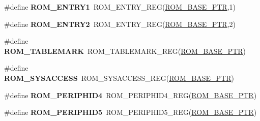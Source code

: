 \begin{DoxyCompactItemize}
\item 
\mbox{\label{group___r_o_m___register___accessor___macros_gac1064716d92d1384ff4b0bf063baabe6}} 
\#define {\bfseries R\+O\+M\+\_\+\+E\+N\+T\+R\+Y1}~R\+O\+M\+\_\+\+E\+N\+T\+R\+Y\+\_\+\+R\+EG(\hyperlink{group___r_o_m___peripheral_ga5ad426d10b6832ca7012e8767113f686}{R\+O\+M\+\_\+\+B\+A\+S\+E\+\_\+\+P\+TR},1)
\item 
\mbox{\label{group___r_o_m___register___accessor___macros_ga0ae5079cc5e456ff696440862af66421}} 
\#define {\bfseries R\+O\+M\+\_\+\+E\+N\+T\+R\+Y2}~R\+O\+M\+\_\+\+E\+N\+T\+R\+Y\+\_\+\+R\+EG(\hyperlink{group___r_o_m___peripheral_ga5ad426d10b6832ca7012e8767113f686}{R\+O\+M\+\_\+\+B\+A\+S\+E\+\_\+\+P\+TR},2)
\item 
\mbox{\label{group___r_o_m___register___accessor___macros_gaf0a5aeb4d78f9d16a13d1e5372484075}} 
\#define {\bfseries R\+O\+M\+\_\+\+T\+A\+B\+L\+E\+M\+A\+RK}~R\+O\+M\+\_\+\+T\+A\+B\+L\+E\+M\+A\+R\+K\+\_\+\+R\+EG(\hyperlink{group___r_o_m___peripheral_ga5ad426d10b6832ca7012e8767113f686}{R\+O\+M\+\_\+\+B\+A\+S\+E\+\_\+\+P\+TR})
\item 
\mbox{\label{group___r_o_m___register___accessor___macros_gae51b2981e6f366d1b80e622b8642423b}} 
\#define {\bfseries R\+O\+M\+\_\+\+S\+Y\+S\+A\+C\+C\+E\+SS}~R\+O\+M\+\_\+\+S\+Y\+S\+A\+C\+C\+E\+S\+S\+\_\+\+R\+EG(\hyperlink{group___r_o_m___peripheral_ga5ad426d10b6832ca7012e8767113f686}{R\+O\+M\+\_\+\+B\+A\+S\+E\+\_\+\+P\+TR})
\item 
\mbox{\label{group___r_o_m___register___accessor___macros_gaba945b0541931f93e793ba6b9afd31fb}} 
\#define {\bfseries R\+O\+M\+\_\+\+P\+E\+R\+I\+P\+H\+I\+D4}~R\+O\+M\+\_\+\+P\+E\+R\+I\+P\+H\+I\+D4\+\_\+\+R\+EG(\hyperlink{group___r_o_m___peripheral_ga5ad426d10b6832ca7012e8767113f686}{R\+O\+M\+\_\+\+B\+A\+S\+E\+\_\+\+P\+TR})
\item 
\mbox{\label{group___r_o_m___register___accessor___macros_gac146375adf3530980926efe6bd28cdbf}} 
\#define {\bfseries R\+O\+M\+\_\+\+P\+E\+R\+I\+P\+H\+I\+D5}~R\+O\+M\+\_\+\+P\+E\+R\+I\+P\+H\+I\+D5\+\_\+\+R\+EG(\hyperlink{group___r_o_m___peripheral_ga5ad426d10b6832ca7012e8767113f686}{R\+O\+M\+\_\+\+B\+A\+S\+E\+\_\+\+P\+TR})

\end{DoxyCompactItemize}

